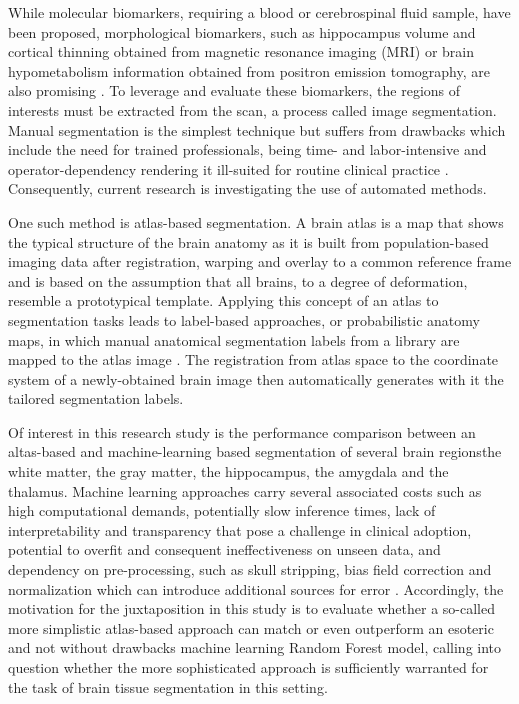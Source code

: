 While molecular biomarkers, requiring a blood or cerebrospinal fluid sample, have been proposed, morphological biomarkers, such as hippocampus volume and cortical thinning obtained from magnetic resonance imaging (MRI) or brain hypometabolism information obtained from positron emission tomography, are also promising \cite{b4,b5}. To leverage and evaluate these biomarkers, the regions of interests must be extracted from the scan, a process called image segmentation. Manual segmentation is the simplest technique but suffers from drawbacks which include the need for trained professionals, being time- and labor-intensive and operator-dependency rendering it ill-suited for routine clinical practice \cite{b6}. Consequently, current research is investigating the use of automated methods.

One such method is atlas-based segmentation. A brain atlas is a map that shows the typical structure of the brain anatomy as it is built from population-based imaging data after registration, warping and overlay to a common reference frame and is based on the assumption that all brains, to a degree of deformation, resemble a prototypical template. Applying this concept of an atlas to segmentation tasks leads to label-based approaches, or probabilistic anatomy maps, in which manual anatomical segmentation labels from a library are mapped to the atlas image \cite{b7}. The registration from atlas space to the coordinate system of a newly-obtained brain image then automatically generates with it the tailored segmentation labels.

Of interest in this research study is the performance comparison between an altas-based and machine-learning based segmentation of several brain regions\textemdash{}the white matter, the gray matter, the hippocampus, the amygdala and the thalamus. Machine learning approaches carry several associated costs such as high computational demands, potentially slow inference times, lack of interpretability and transparency that pose a challenge in clinical adoption, potential to overfit and consequent ineffectiveness on unseen data, and dependency on pre-processing, such as skull stripping, bias field correction and normalization which can introduce additional sources for error \cite{b8,b9}. Accordingly, the motivation for the juxtaposition in this study is to evaluate whether a so-called more simplistic atlas-based approach can match or even outperform an esoteric and not without drawbacks machine learning Random Forest model, calling into question whether the more sophisticated approach is sufficiently warranted for the task of brain tissue segmentation in this setting.




















